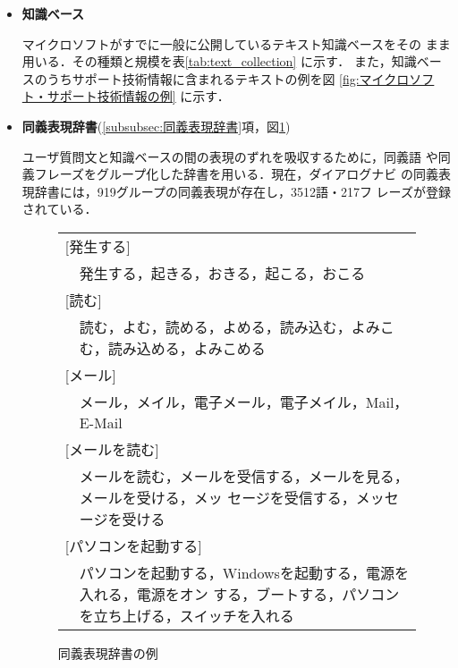 \begin{itemize}
 \item {\bf 知識ベース}

       マイクロソフトがすでに一般に公開しているテキスト知識ベースをその
       まま用いる．その種類と規模を表\ref{tab:text_collection} に示す．
       また，知識ベースのうちサポート技術情報に含まれるテキストの例を図
       \ref{fig:マイクロソフト・サポート技術情報の例} に示す．

 \item {\bf 同義表現辞書}(\ref{subsubsec:同義表現辞書}項，図\ref{fig:同義表現辞書})

       ユーザ質問文と知識ベースの間の表現のずれを吸収するために，同義語
       や同義フレーズをグループ化した辞書を用いる．現在，ダイアログナビ
       の同義表現辞書には，919グループの同義表現が存在し，3512語・217フ
       レーズが登録されている．

\begin{figure}
 \begin{center}
  \footnotesize
  \begin{tabular}{|c@{}p{10cm}|} \hline
   \multicolumn{2}{|l|}{[発生する]} \\
   \hspace{5mm} & 発生する，起きる，おきる，起こる，おこる \\
   \multicolumn{2}{|l|}{[読む]} \\
   \hspace{5mm} & 読む，よむ，読める，よめる，読み込む，よみこむ，読み込める，よみこめる \\
   \multicolumn{2}{|l|}{[メール]} \\
   \hspace{5mm} & メール，メイル，電子メール，電子メイル，Mail，E-Mail \\
   \multicolumn{2}{|l|}{[メールを読む]} \\
   \hspace{5mm} & メールを読む，メールを受信する，メールを見る，メールを受ける，メッ
   セージを受信する，メッセージを受ける \\
   \multicolumn{2}{|l|}{[パソコンを起動する]} \\
   \hspace{5mm} & パソコンを起動する，Windowsを起動する，電源を入れる，電源をオン
   する，ブートする，パソコンを立ち上げる，スイッチを入れる \\
   \hline
  \end{tabular}

  \caption{同義表現辞書の例} \label{fig:同義表現辞書}
 \end{center}
\end{figure}


\end{itemize}
